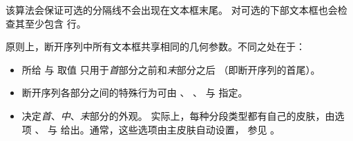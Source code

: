 该算法会保证可选的分隔线不会出现在文本框末尾。
对可选的下部文本框也会检查其至少包含  行。

\clearpage
原则上，断开序列中所有文本框共享相同的几何参数。不同之处在于：
\begin{itemize}
\item 所给  与  取值
  只用于\emph{首}部分之前和\emph{末}部分之后
  （即断开序列的首尾）。
\item 断开序列各部分之间的特殊行为可由
  、
  、
   与
   指定。
\item {} 决定\emph{首}、\emph{中}、\emph{末}部分的外观。
  实际上，每种分段类型都有自己的皮肤，由选项
  、 与
   给出。通常，这些选项由主皮肤自动设置，
  参见 。
\end{itemize}



